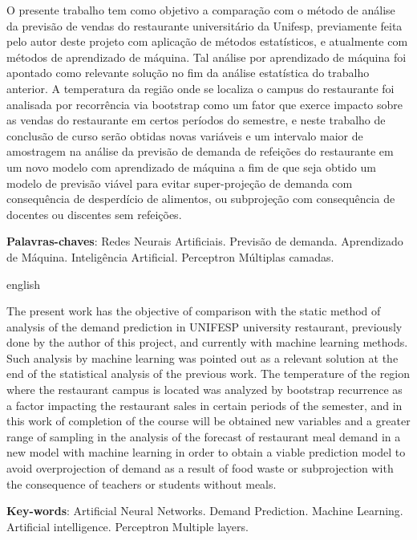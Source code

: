 \documentclass[	12pt, Times, openright, twoside, a4paper, english, brazil]{abntex2}
\begin{document}
\begin{resumo}
O presente trabalho tem como objetivo a comparação com o método de análise da previsão de vendas do restaurante universitário da Unifesp, previamente feita pelo autor deste projeto com aplicação de métodos estatísticos, e atualmente com métodos de aprendizado de máquina. Tal análise por aprendizado de máquina foi apontado como relevante solução no fim da análise estatística do trabalho anterior. A temperatura da região onde se localiza o campus do restaurante foi analisada por recorrência via bootstrap como um fator que exerce impacto sobre as vendas do restaurante em certos períodos do semestre, e neste trabalho de conclusão de curso serão obtidas novas variáveis e um intervalo maior de amostragem na análise da previsão de demanda de refeições do restaurante em um novo modelo com aprendizado de máquina a fim de que seja obtido um modelo de previsão viável para evitar super-projeção de demanda com consequência de desperdício de alimentos, ou subprojeção com consequência de docentes ou discentes sem refeições.
 
 \vspace{\onelineskip}
    
 \noindent
 \textbf{Palavras-chaves}: Redes Neurais Artificiais. Previsão de demanda. Aprendizado de Máquina. Inteligência Artificial. Perceptron Múltiplas camadas. 
 
\end{resumo}

\begin{resumo}[Abstract]
 \begin{otherlanguage*}{english}

The present work has the objective of comparison with the static method of analysis of the demand prediction in UNIFESP university restaurant, previously done by the author of this project, and currently with machine learning methods. Such analysis by machine learning was pointed out as a relevant solution at the end of the statistical analysis of the previous work. The temperature of the region where the restaurant campus is located was analyzed by bootstrap recurrence as a factor impacting the restaurant sales in certain periods of the semester, and in this work of completion of the course will be obtained new variables and a greater range of sampling in the analysis of the forecast of restaurant meal demand in a new model with machine learning in order to obtain a viable prediction model to avoid overprojection of demand as a result of food waste or subprojection with the consequence of teachers or students without meals.

   \vspace{\onelineskip}
 
   \noindent 
   \textbf{Key-words}: Artificial Neural Networks. Demand Prediction. Machine Learning. Artificial intelligence. Perceptron Multiple layers.
 \end{otherlanguage*}
\end{resumo}
\end{document}
